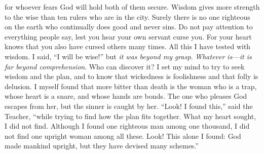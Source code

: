 \begin{biblechapter}
for whoever fears God will hold both of them secure.
 Wisdom gives more strength to the wise 
than ten rulers who are in the city.
\verse Surely there is no one righteous on the earth 
who continually does good and never sins.
\verse Do not pay attention to everything people say, 
lest you hear your own servant curse you.
\verse For your heart knows 
that you also have cursed others many times.
 All this I have tested with wisdom. I said, “I will be wise!” but \textit{it was beyond my grasp}.
\verse \textit{Whatever is—it is far beyond comprehension}. Who can discover it?
\verse I set my mind to try to seek wisdom and the plan, and to know that wickedness is foolishness and that folly is delusion.
\verse I myself found that more bitter than death is the woman who is a trap, whose heart is a snare, and whose hands are bonds. The one who pleases God escapes from her, but the sinner is caught by her.
\verse “Look! I found this,” said the Teacher, “while trying to find how the plan fits together.
\verse What my heart sought, I did not find. Although I found one righteous man among one thousand, I did not find one upright woman among all these.
\verse Look! This alone I found: God made mankind upright, but they have devised many schemes.”
\end{biblechapter}

